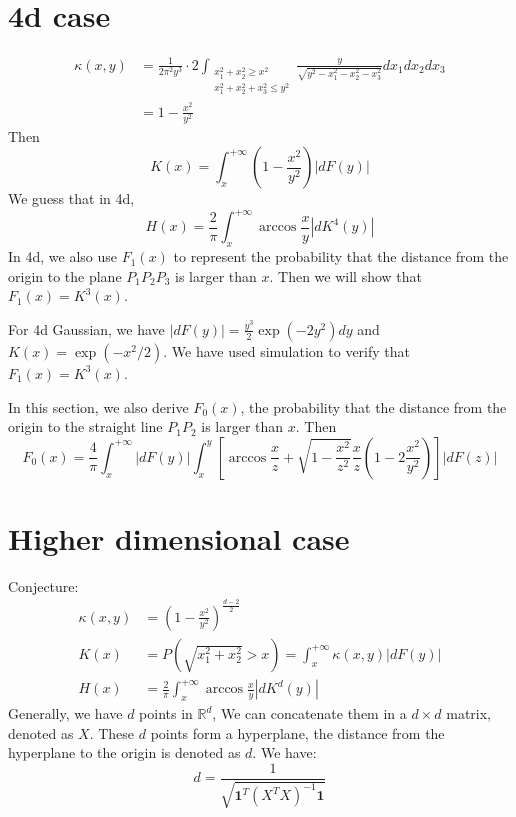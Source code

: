 \documentclass{article}
\begin{document}
\section{4d case}
\begin{align}
    \kappa(x,y) &=\frac{1}{2\pi^2 y^3} 
    \cdot 2\int_{\substack{x_1^2+x_2^2\geq x^2\\
    x_1^2+x_2^2+x_3^2\leq y^2 }} 
    \frac{y}{\sqrt{y^2-x_1^2-x_2^2-x_3^2}} dx_1 dx_2 dx_3\\
&=    1-\frac{x^2}{y^2}
\end{align}
Then
\begin{equation}
    K(x) = \int_x^{+\infty}
    (1-\frac{x^2}{y^2}) |dF(y)|
\end{equation}
We guess that in 4d,
\begin{equation}
    H(x) = \frac{2}{\pi}
    \int_x^{+\infty} \arccos\frac{x}{y}
    |d K^4(y)|
\end{equation}
In 4d, we also use $F_1(x)$ to represent the probability that
the distance from the origin to the plane $P_1P_2P_3$
is larger than $x$. Then we will show that $F_1(x)=K^3(x)$.

For 4d Gaussian, we have $|dF(y)| =
\frac{y^3}{2}\exp(-2y^2)dy$ and $K(x) = \exp(-x^2/2)$.
We have used simulation to verify that $F_1(x) = K^3(x)$.

In this section, we also derive $F_0(x)$,
the probability that
the distance from the origin to the straight line
$P_1P_2$
is larger than $x$.
Then
\begin{equation}
    F_0(x) =  \frac{4}{\pi}\int_x^{+\infty} |dF(y)|
    \int_x^{y} \left[\arccos \frac{x}{z}
    + \sqrt{1-\frac{x^2}{z^2}}\frac{x}{z}
    \left(1-2\frac{x^2}{y^2} \right) \right] |dF(z)|
\end{equation}
\section{Higher dimensional case}
Conjecture:
\begin{align*}
    \kappa(x,y) & =(1-\frac{x^2}{y^2})^{\frac{d-2}{2}}\\
    K(x) &=P(\sqrt{x_1^2+x_2^2}>x)= \int_x^{+\infty} \kappa(x,y)|dF(y)| \\
    H(x) &= \frac{2}{\pi}
    \int_x^{+\infty} \arccos\frac{x}{y}
    |d K^d(y)|
\end{align*}
Generally, we have $d$ points in $\mathbb{R}^d$, We
can concatenate them
in a $d\times d$ matrix, denoted as $X$.
These $d$ points form a hyperplane,
the distance from the hyperplane to the origin is denoted as $d$.
We have:
\begin{equation}
    d = \frac{1}{\sqrt{\mathbf{1}^T (X^T X)^{-1} \mathbf{1}}}
\end{equation}
\end{document}
